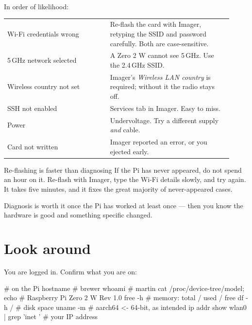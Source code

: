 In order of likelihood:

\begin{center}\small
\begin{tabular}{@{}L{0.42\linewidth}L{0.50\linewidth}@{}}
\toprule
{} &  \\
\midrule
Wi-Fi credentials wrong & Re-flash the card with Imager, retyping the SSID and password carefully. Both are case-sensitive. \\
5\,GHz network selected & A Zero 2 W cannot see 5\,GHz. Use the 2.4\,GHz SSID. \\
Wireless country not set & Imager's \emph{Wireless LAN country} is required; without it the radio stays off. \\
SSH not enabled & Services tab in Imager. Easy to miss. \\
Power & Undervoltage. Try a different supply \emph{and} cable. \\
Card not written & Imager reported an error, or you ejected early. \\
\bottomrule
\end{tabular}
\end{center}

\begin{trap}{Re-flashing is faster than diagnosing}
If the Pi has never appeared, do not spend an hour on it. Re-flash with Imager,
type the Wi-Fi details slowly, and try again. It takes five minutes, and it fixes
the great majority of never-appeared cases.

Diagnosis is worth it once the Pi has worked at least once --- then you know the
hardware is good and something specific changed.
\end{trap}

\section{Look around}

You are logged in. Confirm what you are on:

\begin{shell}
# on the Pi
hostname                              # brewer
whoami                                # martin
cat /proc/device-tree/model; echo     # Raspberry Pi Zero 2 W Rev 1.0
free -h                               # memory: total / used / free
df -h /                               # disk space
uname -m                              # aarch64  <- 64-bit, as intended
ip addr show wlan0 | grep 'inet '     # your IP address
\end{shell}

